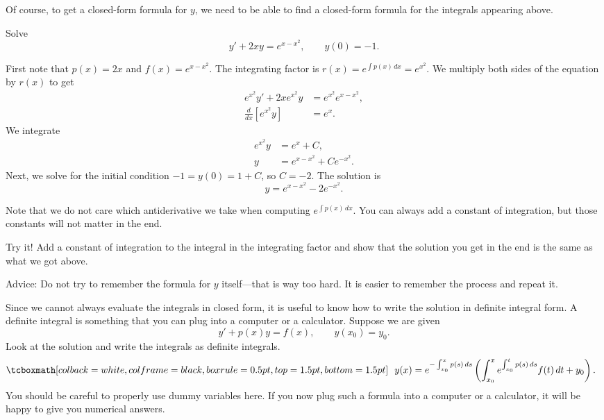 Of course, to get a closed-form formula for $y$,
we need to be able to find a
closed-form formula for the integrals appearing above.

\begin{example}
Solve
\begin{equation*}
y' + 2xy = e^{x-x^2}, \qquad y(0) = -1 .
\end{equation*}

First note that $p(x) = 2x$ and $f(x) = e^{x-x^2}$.
The integrating factor is $r(x) = e^{\int p(x)\, dx} = e^{x^2}$.
We multiply both sides of the equation by $r(x)$ to get
\begin{equation*}
\begin{aligned}
e^{x^2} y' + 2xe^{x^2}y & = e^{x^2} e^{x-x^2} , \\
\frac{d}{dx} \left[ e^{x^2} y \right] &= e^x .
\end{aligned}
\end{equation*}
We integrate
\begin{equation*}
\begin{aligned}
e^{x^2} y &= e^x +C , \\
y &= e^{x-x^2} + C e^{-x^2} .
\end{aligned}
\end{equation*}
Next, we solve for the initial condition $-1 = y(0) = 1 + C$, so $C=-2$.
The solution is
\begin{equation*}
y = e^{x-x^2} - 2 e^{-x^2} .
\end{equation*}
\end{example}

Note that we do not care which antiderivative we take when computing
$e^{\int p(x) \, dx}$.  You can always add a constant of integration,
but those constants
will not matter in the end.

\begin{exercise}
Try it!  Add a constant of integration to the integral in
the integrating factor and show that the solution you get in the end is the
same as what we got above.
\end{exercise}

Advice: Do not try to remember the formula for $y$ itself---that is way too
hard.  It is easier to remember the process and repeat it.

Since we cannot always evaluate the integrals in closed form, it is useful to
know how to write the solution in definite integral form.  A definite
integral is something that
you can plug into a computer or a calculator.  Suppose we are given
\begin{equation*}
y' + p(x) y = f(x) , \qquad y(x_0) = y_0 .
\end{equation*}
Look at the solution and write the integrals
as definite integrals.
\begin{equation} \label{lei:defsol}
\mybxbg{
~~
y(x) = e^{-\int_{x_0}^x p(s)\, ds} \left( \int_{x_0}^x e^{\int_{x_0}^t p(s)\, ds}
f(t) \,dt + y_0 \right).
~~
}
\end{equation}
You should
be careful to properly use dummy variables here.  If you now plug such a
formula into a
computer or a calculator, it will be happy to give you numerical answers.

